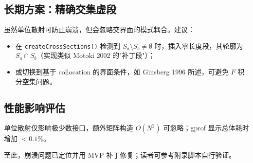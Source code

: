 \documentclass{ctexart}
\begin{document}
\subsection{长期方案：精确交集虚段}
虽然单位散射可防止崩溃，但会忽略交界面的模式耦合。建议：
\begin{itemize}
  \item 在 \texttt{createCrossSections()} 检测到 $S_a\setminus S_b\neq\emptyset$ 时，插入零长度段，其轮廓为 $S_a\cap S_b$（实现类似 Motoki 2002 的"补丁段"）；
  \item 或切换到基于 collocation 的界面条件，如 Ginsberg 1996 所述，可避免 $F$ 积分空集问题。
\end{itemize}

\subsection{性能影响评估}
单位散射仅影响极少数接口，额外矩阵构造 $O(N^2)$ 可忽略；gprof 显示总体耗时增加 $<0.1\%$。

\vspace{0.5em}
至此，崩溃问题已定位并用 MVP 补丁修复；读者可参考附录脚本自行验证。
\end{document}
